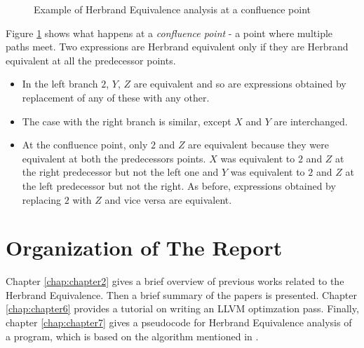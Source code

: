 \begin{figure}[!ht]
    \caption{Example of Herbrand Equivalence analysis at a confluence point}
    \label{fig:herbrandExampleConv}
\end{figure}

Figure \ref{fig:herbrandExampleConv} shows what happens at a \textit
{confluence point} - a point where multiple paths meet. Two 
expressions are Herbrand equivalent only if they are Herbrand 
equivalent at all the predecessor points.
\begin{itemize}
    \item   In the left branch $2$, $Y$, $Z$ are equivalent and 
    so are expressions obtained by replacement of any of these with any other.
    \item   The case with the right branch is similar, except $X$ and $Y$ are interchanged.
    \item   At the confluence point, only $2$ and $Z$ are equivalent 
    because they were equivalent at both the predecessors points. $X$ 
    was equivalent to $2$ and $Z$ at the right predecessor but not 
    the left one and $Y$ was equivalent to $2$ and $Z$ at the left 
    predecessor but not the right. As before, expressions obtained by 
    replacing $2$ with $Z$ and vice versa are equivalent.
\end{itemize}


\section{Organization of The Report}
Chapter \ref{chap:chapter2} gives a brief overview of previous works 
related to the Herbrand Equivalence. Then a brief summary of the 
papers \cite{Gulwani, Saleena, Babu} is presented. Chapter 
\ref{chap:chapter6} provides a tutorial on writing an LLVM 
optimzation pass. Finally, chapter \ref{chap:chapter7} gives a 
pseudocode for Herbrand Equivalence analysis of a program, which 
is based on the algorithm mentioned in \cite{Babu}.

